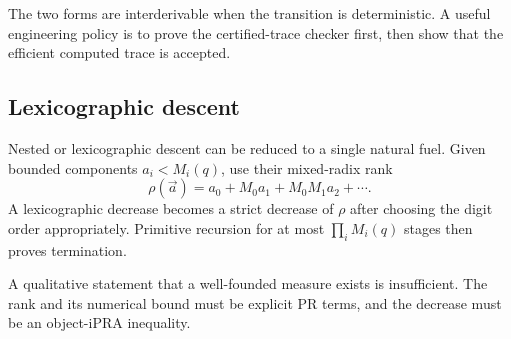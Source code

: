 The two forms are interderivable when the transition is deterministic.  A
useful engineering policy is to prove the certified-trace checker first, then
show that the efficient computed trace is accepted.

\subsection{Lexicographic descent}

Nested or lexicographic descent can be reduced to a single natural fuel.  Given
bounded components \(a_i<M_i(q)\), use their mixed-radix rank
\[
  \rho(\vec a)=a_0+M_0a_1+M_0M_1a_2+\cdots.
\]
A lexicographic decrease becomes a strict decrease of \(\rho\) after choosing
the digit order appropriately.  Primitive recursion for at most
\(\prod_iM_i(q)\) stages then proves termination.

\begin{warning}
A qualitative statement that a well-founded measure exists is insufficient.
The rank and its numerical bound must be explicit PR terms, and the decrease
must be an object-iPRA inequality.
\end{warning}
